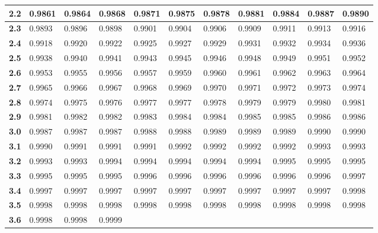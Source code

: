 \begin{longtable}{|l|l|l|l|l|l|l|l|l|l|l|}
    \textbf{2.2}  & 0.9861  & 0.9864  & 0.9868  & 0.9871  & 0.9875  & 0.9878  & 0.9881  & 0.9884  & 0.9887  & 0.9890\\ \hline
    
    \textbf{2.3}  & 0.9893  & 0.9896  & 0.9898  & 0.9901  & 0.9904  & 0.9906  & 0.9909  & 0.9911  & 0.9913  & 0.9916\\ \hline
    
    \textbf{2.4}  & 0.9918  & 0.9920  & 0.9922  & 0.9925  & 0.9927  & 0.9929  & 0.9931  & 0.9932  & 0.9934  & 0.9936\\ \hline
    
    \textbf{2.5}  & 0.9938  & 0.9940  & 0.9941  & 0.9943  & 0.9945  & 0.9946  & 0.9948  & 0.9949  & 0.9951  & 0.9952\\ \hline
    
    \textbf{2.6}  & 0.9953  & 0.9955  & 0.9956  & 0.9957  & 0.9959  & 0.9960  & 0.9961  & 0.9962  & 0.9963  & 0.9964\\ \hline
    
    \textbf{2.7}  & 0.9965  & 0.9966  & 0.9967  & 0.9968  & 0.9969  & 0.9970  & 0.9971  & 0.9972  & 0.9973  & 0.9974\\ \hline
    
    \textbf{2.8}  & 0.9974  & 0.9975  & 0.9976  & 0.9977  & 0.9977  & 0.9978  & 0.9979  & 0.9979  & 0.9980  & 0.9981\\ \hline
    
    \textbf{2.9}  & 0.9981  & 0.9982  & 0.9982  & 0.9983  & 0.9984  & 0.9984  & 0.9985  & 0.9985  & 0.9986  & 0.9986\\ \hline
    
    \textbf{3.0}  & 0.9987  & 0.9987  & 0.9987  & 0.9988  & 0.9988  & 0.9989  & 0.9989  & 0.9989  & 0.9990  & 0.9990\\ \hline
    
    \textbf{3.1}  & 0.9990  & 0.9991  & 0.9991  & 0.9991  & 0.9992  & 0.9992  & 0.9992  & 0.9992  & 0.9993  & 0.9993\\ \hline
    
    \textbf{3.2}  & 0.9993  & 0.9993  & 0.9994  & 0.9994  & 0.9994  & 0.9994  & 0.9994  & 0.9995  & 0.9995  & 0.9995\\ \hline
    
    \textbf{3.3}  & 0.9995  & 0.9995  & 0.9995  & 0.9996  & 0.9996  & 0.9996  & 0.9996  & 0.9996  & 0.9996  & 0.9997\\ \hline
    
    \textbf{3.4}  & 0.9997  & 0.9997  & 0.9997  & 0.9997  & 0.9997  & 0.9997  & 0.9997  & 0.9997  & 0.9997  & 0.9998\\ \hline
    
    \textbf{3.5}  & 0.9998  & 0.9998  & 0.9998  & 0.9998  & 0.9998  & 0.9998  & 0.9998  & 0.9998  & 0.9998  & 0.9998\\ \hline
    
    \textbf{3.6}  & 0.9998  & 0.9998  & 0.9999 &         &           &       &           &       &           &       \\ \hline
\end{longtable}

\changefontsizes{11pt}










